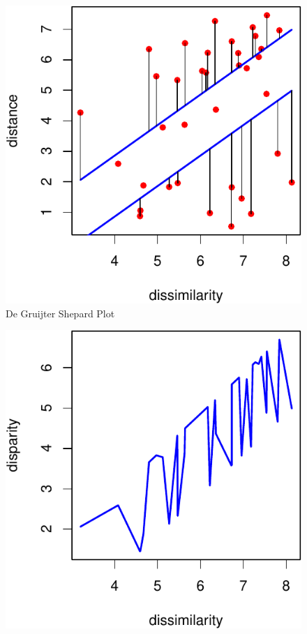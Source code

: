 \documentclass[
  12pt,
]{article}
\begin{document}
\begin{figure}

{\centering \includegraphics{smacofAC_files/figure-latex/optbandplot-1} 

}

\caption{De Gruijter Shepard Plot}\label{fig:optbandplot}
\end{figure}

\begin{figure}

{\centering \includegraphics{smacofAC_files/figure-latex/ddhatplot-1} 

}

\end{figure}
\end{document}
